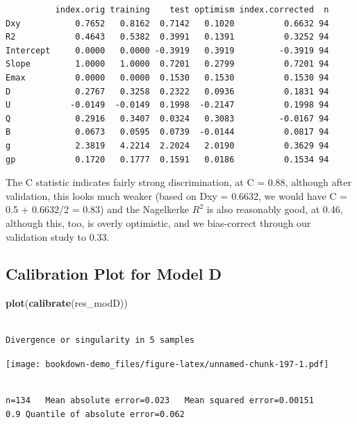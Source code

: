 \documentclass[]{book}
\newenvironment{Shaded}{\begin{snugshade}}{\end{snugshade}}
\newcommand{\KeywordTok}[1]{\textcolor[rgb]{0.13,0.29,0.53}{\textbf{#1}}}
\newcommand{\NormalTok}[1]{#1}
\theoremstyle{definition}
\theoremstyle{definition}
\theoremstyle{definition}
\theoremstyle{remark}
\begin{document}
\begin{verbatim}
          index.orig training    test optimism index.corrected  n
Dxy           0.7652   0.8162  0.7142   0.1020          0.6632 94
R2            0.4643   0.5382  0.3991   0.1391          0.3252 94
Intercept     0.0000   0.0000 -0.3919   0.3919         -0.3919 94
Slope         1.0000   1.0000  0.7201   0.2799          0.7201 94
Emax          0.0000   0.0000  0.1530   0.1530          0.1530 94
D             0.2767   0.3258  0.2322   0.0936          0.1831 94
U            -0.0149  -0.0149  0.1998  -0.2147          0.1998 94
Q             0.2916   0.3407  0.0324   0.3083         -0.0167 94
B             0.0673   0.0595  0.0739  -0.0144          0.0817 94
g             2.3819   4.2214  2.2024   2.0190          0.3629 94
gp            0.1720   0.1777  0.1591   0.0186          0.1534 94
\end{verbatim}

The C statistic indicates fairly strong discrimination, at C = 0.88,
although after validation, this looks much weaker (based on Dxy =
0.6632, we would have C = 0.5 + 0.6632/2 = 0.83) and the Nagelkerke
\(R^2\) is also reasonably good, at 0.46, although this, too, is overly
optimistic, and we bias-correct through our validation study to 0.33.

\subsection{Calibration Plot for Model
D}\label{calibration-plot-for-model-d}

\begin{Shaded}
\begin{Highlighting}[]
\KeywordTok{plot}\NormalTok{(}\KeywordTok{calibrate}\NormalTok{(res_modD))}
\end{Highlighting}
\end{Shaded}

\begin{verbatim}

Divergence or singularity in 5 samples
\end{verbatim}

\texttt{[image: bookdown-demo\_files/figure-latex/unnamed-chunk-197-1.pdf]}

\begin{verbatim}

n=134   Mean absolute error=0.023   Mean squared error=0.00151
0.9 Quantile of absolute error=0.062
\end{verbatim}
\end{document}
